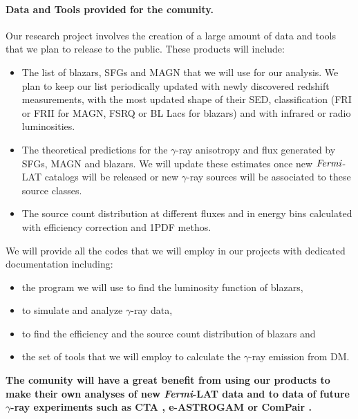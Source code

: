 \documentclass[12 pt]{article}
\newcommand{\FIXME}[1]{{\color{red}{\em Comment: }{#1}}}
\begin{document}
\paragraph{Data and Tools provided for the comunity.}
Our research project involves the creation of a large amount of data and tools that we plan to release to the public. These products will include:
\begin{itemize}
\vspace{-0.3cm}
\item The list of blazars, SFGs and MAGN that we will use for our analysis.
We plan to keep our list periodically updated with newly discovered redshift measurements, with the most updated shape of their SED, classification (FRI or FRII for MAGN, FSRQ or BL Lacs for blazars) and with infrared or radio luminosities.
\vspace{-0.3cm}
\item The theoretical predictions for the $\gamma$-ray anisotropy and flux generated by SFGs, MAGN and blazars. We will update these estimates once new ${\it Fermi}$-LAT catalogs will be released or new $\gamma$-ray sources will be associated to these source classes.
\vspace{-0.3cm}
\item The source count distribution at different fluxes and in energy bins calculated with efficiency correction and 1PDF methos.
\vspace{-0.3cm}
\end{itemize}
We will provide all the codes that we will employ in our projects with dedicated documentation including:
\begin{itemize}
\vspace{-0.3cm}
\item the program we will use to find the luminosity function of blazars,
\vspace{-0.3cm}
\item to simulate and analyze $\gamma$-ray data,
\vspace{-0.3cm}
\item to find the efficiency and the source count distribution of blazars and
\vspace{-0.3cm}
\item the set of tools that we will employ to calculate the $\gamma$-ray emission from DM.
\vspace{-0.3cm}
\end{itemize}
{\bf The comunity will have a great benefit from using our products to make their own analyses of new {\it Fermi}-LAT data and to data of future $\gamma$-ray experiments such as CTA \cite{Ong:2017ihp}, e-ASTROGAM \cite{Tatischeff:2016ykb} or ComPair \cite{Moiseev:2015lva}.}
\end{document}
